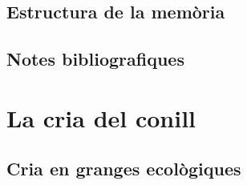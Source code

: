 \documentclass[11pt,catalan,
               listoftables,listoffigures,listofalgorithms,listofquadres]
               {tfgetsinf}
\begin{document}
\lipsum[6]
\lipsum[7]
\lipsum[8]

\section{Estructura de la mem\`oria}

\lipsum[9]
\lipsum[10]

\section{Notes bibliografiques}

\lipsum[11]
\lipsum[12]
\lipsum[13]


\chapter{La cria del conill}


\lipsum[14]
\lipsum[15]
\lipsum[16]
\lipsum[17]
\lipsum[18]

\section{Cria en granges ecològiques}
\end{document}
